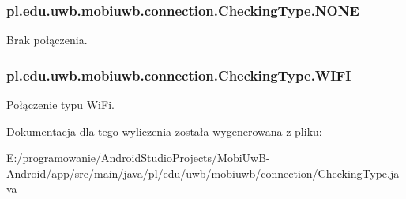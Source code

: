 \subsubsection[{N\+O\+N\+E}]{\setlength{\rightskip}{0pt plus 5cm}pl.\+edu.\+uwb.\+mobiuwb.\+connection.\+Checking\+Type.\+N\+O\+N\+E}\label{enumpl_1_1edu_1_1uwb_1_1mobiuwb_1_1connection_1_1_checking_type_a77141ca6eef0f4727ab8953b8c7242eb}
Brak połączenia. \hypertarget{enumpl_1_1edu_1_1uwb_1_1mobiuwb_1_1connection_1_1_checking_type_a1ef367074b29fb99e5d6d8f624a5a05e}{}
\subsubsection[{W\+I\+F\+I}]{\setlength{\rightskip}{0pt plus 5cm}pl.\+edu.\+uwb.\+mobiuwb.\+connection.\+Checking\+Type.\+W\+I\+F\+I}\label{enumpl_1_1edu_1_1uwb_1_1mobiuwb_1_1connection_1_1_checking_type_a1ef367074b29fb99e5d6d8f624a5a05e}
Połączenie typu Wi\+Fi. 

Dokumentacja dla tego wyliczenia została wygenerowana z pliku\+:\begin{DoxyCompactItemize}
\item 
E\+:/programowanie/\+Android\+Studio\+Projects/\+Mobi\+Uw\+B-\/\+Android/app/src/main/java/pl/edu/uwb/mobiuwb/connection/Checking\+Type.\+java\end{DoxyCompactItemize}
